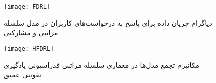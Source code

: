 \begin{figure}[ht]
	\centerline{\texttt{[image: FDRL]}}
	\caption{دیاگرام جریان داده برای پاسخ به درخواست‌های کاربران در مدل سلسله مراتبی و مشارکتی}
	\label{fig:fdrl}
\end{figure}

\begin{figure}[ht]
	\centerline{\texttt{[image: HFDRL]}}
	\caption{مکانیزم تجمع مدل‌ها در معماری سلسله مراتبی فدراسیونی یادگیری تقویتی عمیق}
	\label{fig:hfdrl}
\end{figure}

